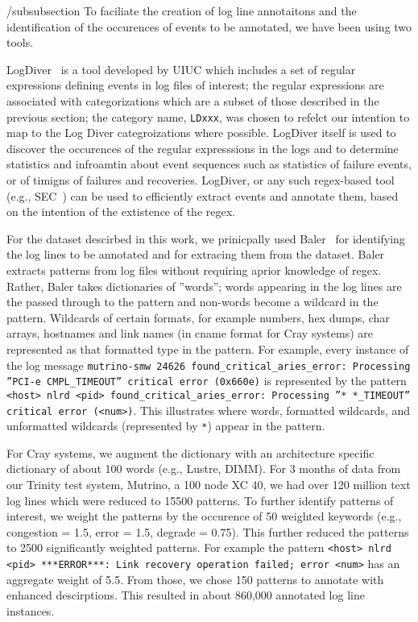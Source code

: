 /subsubsection{}
To faciliate the creation of log line annotaitons
and the identification of the occurences of events to be annotated,
we have been using two tools.

LogDiver~\cite{LogDiver} is a tool developed by UIUC which includes a set of regular expressions defining
events in log files of interest; the regular expressions are associated with categorizations
which are a subset of those described in the previous section; the
category name, \texttt{LDxxx}, was chosen to refelct our intention to map to the
Log Diver categroizations where possible.
LogDiver itself is used to discover the occurences of the regular
expresssions in the logs and to determine statistics and infroamtin about event sequences
such as statistics of failure events, or of timigns of failures and recoveries.
LogDiver, or any such regex-based tool (e.g., SEC~\cite{SEC}) can be used to efficiently extract events
and annotate them, based on the intention of the extistence of the regex.

For the dataset descirbed in this work, we prinicpally used Baler~\cite{Baler} for
identifying the log lines to be annotated and for extracing them from the dataset.
Baler extracts patterns from log files without requiring aprior knowledge of
regex. Rather, Baler takes dictionaries of ''words''; words appearing in the log lines
are the passed through to the pattern and non-words become a wildcard in the pattern.
Wildcards of certain formats, for example numbers, hex dumps, char arrays, hostnames and link names
(in cname format for Cray systems) are represented as that formatted type in the pattern.
For example, every instance of the log message \texttt{mutrino-smw 24626 found\_critical\_aries\_error: Processing ''PCI-e CMPL\_TIMEOUT'' critical error (0x660e)}
is represented by the pattern \texttt{<host> nlrd <pid> found\_critical\_aries\_error: Processing ''* *\_TIMEOUT'' critical error (<num>)}.
This illustrates where words, formatted wildcards, and unformatted wildcards (represented by \texttt{*}) appear in the pattern.

For Cray systems, we augment
the dictionary with an architecture specific dictionary of about 100 words (e.g., Lustre, DIMM).
For 3 months of data from our Trinity test system, Mutrino, a 100 node XC 40,
we had over 120 million text log lines which were reduced to 15500 patterns. To further identify patterns
of interest, we weight the patterns by the occurence of 50 weighted
keywords (e.g., congestion = 1.5, error = 1.5, degrade = 0.75). This further reduced the patterns
to 2500 significantly weighted patterns. For example the pattern
\texttt{<host> nlrd <pid> ***ERROR***: Link recovery operation failed; error <num>} has
an aggregate weight of 5.5. From those, we chose 150
patterns to annotate with enhanced descirptions. This resulted in about 860,000
annotated log line instances.

